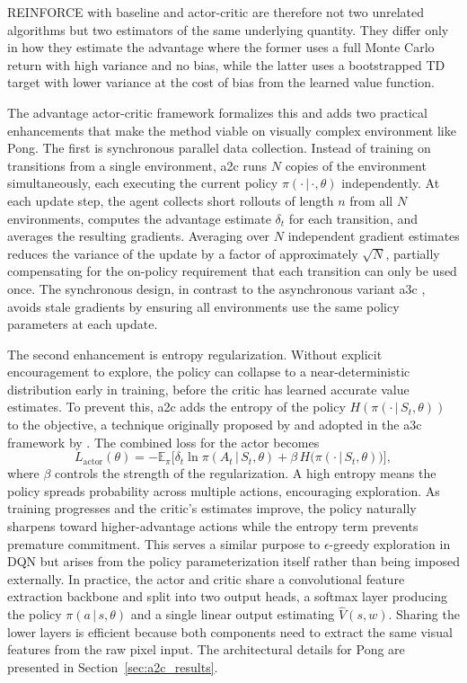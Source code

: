 REINFORCE with baseline and actor-critic are therefore not two unrelated algorithms but two estimators of the same underlying quantity. They differ only in how they estimate the advantage where the former uses a full Monte Carlo return with high variance and no bias, while the latter uses a bootstrapped TD target with lower variance at the cost of bias from the learned value function.

The advantage actor-critic framework formalizes this and adds two practical enhancements that make the method viable on visually complex environment like Pong. The first is synchronous parallel data collection. Instead of training on transitions from a single environment, \acrshort{a2c} runs $N$ copies of the environment simultaneously, each executing the current policy $\pi(\cdot\,|\,\cdot, \theta)$ independently. At each update step, the agent collects short rollouts of length $n$ from all $N$ environments, computes the advantage estimate $\delta_t$ for each transition, and averages the resulting gradients. Averaging over $N$ independent gradient estimates reduces the variance of the update by a factor of approximately $\sqrt{N}$, partially compensating for the on-policy requirement that each transition can only be used once. The synchronous design, in contrast to the asynchronous variant \acrshort{a3c} \citep{mnihAsynchronousMethodsDeep2016}, avoids stale gradients by ensuring all environments use the same policy parameters at each update.

The second enhancement is entropy regularization. Without explicit encouragement to explore, the policy can collapse to a near-deterministic distribution early in training, before the critic has learned accurate value estimates. To prevent this, \acrshort{a2c} adds the entropy of the policy $H(\pi(\cdot\,|\,S_t, \theta))$ to the objective, a technique originally proposed by \citet{williamsFunctionOptimizationUsing1991} and adopted in the \acrshort{a3c} framework by \citet{mnihAsynchronousMethodsDeep2016}. The combined loss for the actor becomes
\begin{equation}\label{eq:a2c_actor_loss}
	L_\text{actor}(\theta) = -\mathbb{E}_\pi\Big[\delta_t \ln \pi(A_t\,|\,S_t, \theta) + \beta\, H\big(\pi(\cdot\,|\,S_t, \theta)\big)\Big],
\end{equation}
where $\beta$ controls the strength of the regularization. A high entropy means the policy spreads probability across multiple actions, encouraging exploration. As training progresses and the critic's estimates improve, the policy naturally sharpens toward higher-advantage actions while the entropy term prevents premature commitment. This serves a similar purpose to $\epsilon$-greedy exploration in DQN but arises from the policy parameterization itself rather than being imposed externally.
In practice, the actor and critic share a convolutional feature extraction backbone and split into two output heads, a softmax layer producing the policy $\pi(a\,|\,s, \theta)$ and a single linear output estimating $\hat{V}(s, w)$. Sharing the lower layers is efficient because both components need to extract the same visual features from the raw pixel input. The architectural details for Pong are presented in Section~\ref{sec:a2c_results}.

